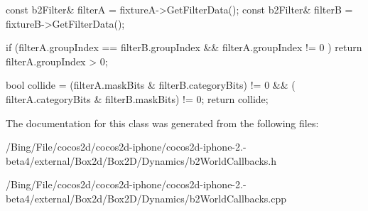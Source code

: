 \begin{DoxyCode}
{
        const b2Filter& filterA = fixtureA->GetFilterData();
        const b2Filter& filterB = fixtureB->GetFilterData();

        if (filterA.groupIndex == filterB.groupIndex && filterA.groupIndex != 0
      )
        {
                return filterA.groupIndex > 0;
        }

        bool collide = (filterA.maskBits & filterB.categoryBits) != 0 && (
      filterA.categoryBits & filterB.maskBits) != 0;
        return collide;
}
\end{DoxyCode}


The documentation for this class was generated from the following files\-:\begin{DoxyCompactItemize}
\item 
/\-Bing/\-File/cocos2d/cocos2d-\/iphone/cocos2d-\/iphone-\/2.-\/beta4/external/\-Box2d/\-Box2\-D/\-Dynamics/b2\-World\-Callbacks.\-h\item 
/\-Bing/\-File/cocos2d/cocos2d-\/iphone/cocos2d-\/iphone-\/2.-\/beta4/external/\-Box2d/\-Box2\-D/\-Dynamics/b2\-World\-Callbacks.\-cpp\end{DoxyCompactItemize}
